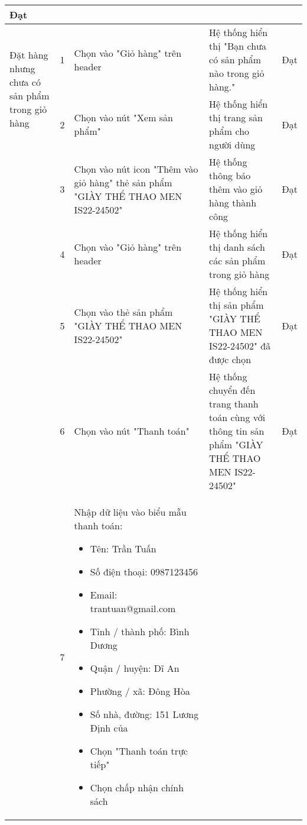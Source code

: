{\begin{longtable}{| p{2.5cm}| p{1cm}| p{5.5cm}| p{4.5cm} | p{1.5cm} |}
         Đạt \\
         \hline
        \multirow[t]{2}{2.5cm}{Đặt hàng nhưng chưa có sản phẩm trong giỏ hàng} & 
        1 & 
        Chọn vào "Giỏ hàng" trên header & 
        Hệ thống hiển thị "Bạn chưa có sản phẩm nào trong giỏ hàng." & 
        Đạt \\
        \cline{2-5}
         & 2 & 
        Chọn vào nút "Xem sản phẩm" & 
        Hệ thống hiển thị trang sản phẩm cho người dùng & 
        Đạt \\
        \cline{2-5}
         & 3 & 
         Chọn vào nút icon "Thêm vào giỏ hàng" thẻ sản phẩm "GIÀY THỂ THAO MEN IS22-24502" & 
         Hệ thống thông báo thêm vào giỏ hàng thành công & 
         Đạt \\
        \cline{2-5}
         & 4 & 
         Chọn vào "Giỏ hàng" trên header & 
        Hệ thống hiển thị danh sách các sản phẩm trong giỏ hàng & 
        Đạt \\
        \cline{2-5}
         & 5 & 
         Chọn vào thẻ sản phẩm "GIÀY THỂ THAO MEN IS22-24502" & 
         Hệ thống hiển thị sản phẩm "GIÀY THỂ THAO MEN IS22-24502" đã được chọn & 
         Đạt \\
        \cline{2-5}
         & 6 & 
         Chọn vào nút "Thanh toán" & 
         Hệ thống chuyển đến trang thanh toán cùng với thông tin sản phẩm "GIÀY THỂ THAO MEN IS22-24502" & 
         Đạt \\
        \cline{2-5}
         & 7 & 
         Nhập dữ liệu vào biểu mẫu thanh toán:
         \begin{itemize}
            \item Tên: Trần Tuấn
            \item Số điện thoại: 0987123456
            \item Email: trantuan@gmail.com
            \item Tỉnh / thành phố: Bình Dương
            \item Quận / huyện: Dĩ An
            \item Phường / xã: Đông Hòa
            \item Số nhà, đường: 151 Lương Định của
            \item Chọn "Thanh toán trực tiếp"
            \item Chọn chấp nhận chính sách
         \end{itemize}

\end{longtable}}
